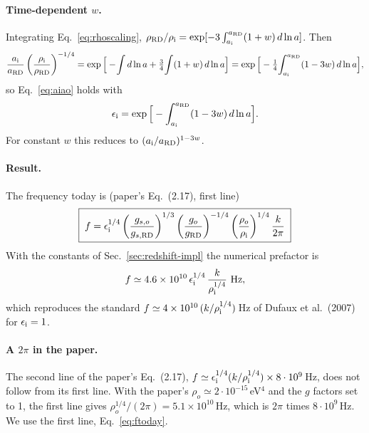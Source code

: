 \documentclass[11pt,a4paper]{article}
\begin{document}
\paragraph{Time-dependent $w$.} Integrating Eq.~\eqref{eq:rhoscaling}, $\rho_{\rm RD}/\rho_{\rm i}=\exp[-3\int_{a_{\rm i}}^{a_{\rm RD}}(1+w)\,d\ln a]$. Then
\begin{equation}
\frac{a_{\rm i}}{a_{\rm RD}}\left(\frac{\rho_{\rm i}}{\rho_{\rm RD}}\right)^{-1/4}
=\exp\Big[-\!\int d\ln a+\tfrac34\!\int(1+w)\,d\ln a\Big]
=\exp\Big[-\tfrac14\!\int_{a_{\rm i}}^{a_{\rm RD}}(1-3w)\,d\ln a\Big],
\end{equation}
so Eq.~\eqref{eq:aiao} holds with
\begin{equation}
\epsilon_{\rm i}=\exp\Big[-\int_{a_{\rm i}}^{a_{\rm RD}}(1-3w)\,d\ln a\Big]. \label{eq:epsi}
\end{equation}
For constant $w$ this reduces to $(a_{\rm i}/a_{\rm RD})^{1-3w}$.

\paragraph{Result.} The frequency today is (paper's Eq.~(2.17), first line)
\begin{equation}
\boxed{\;f=\epsilon_{\rm i}^{1/4}\left(\frac{g_{s,o}}{g_{s,\rm RD}}\right)^{1/3}\left(\frac{g_o}{g_{\rm RD}}\right)^{-1/4}\left(\frac{\rho_o}{\rho_{\rm i}}\right)^{1/4}\frac{k}{2\pi}\;} \label{eq:ftoday}
\end{equation}
With the constants of Sec.~\ref{sec:redshift-impl} the numerical prefactor is
\begin{equation}
f\simeq4.6\times10^{10}\,\epsilon_{\rm i}^{1/4}\,\frac{k}{\rho_{\rm i}^{1/4}}\ \text{Hz}, \label{eq:fnum}
\end{equation}
which reproduces the standard $f\simeq4\times10^{10}\,(k/\rho_{\rm i}^{1/4})$\,Hz of Dufaux et al.\ (2007) for $\epsilon_{\rm i}=1$.

\paragraph{A $2\pi$ in the paper.} The second line of the paper's Eq.~(2.17), $f\simeq\epsilon_{\rm i}^{1/4}(k/\rho_{\rm i}^{1/4})\times8\cdot10^9$\,Hz, does not follow from its first line. With the paper's $\rho_o\simeq2\cdot10^{-15}$\,eV$^4$ and the $g$ factors set to 1, the first line gives $\rho_o^{1/4}/(2\pi)=5.1\times10^{10}$\,Hz, which is $2\pi$ times $8\cdot10^9$\,Hz. We use the first line, Eq.~\eqref{eq:ftoday}.
\end{document}
